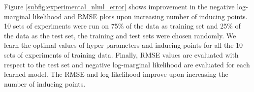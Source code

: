 Figure \ref{subfig:experimental_nlml_error} shows improvement in the negative log-marginal likelihood and RMSE plots upon increasing number of inducing points. 10 sets of experiments were run on 75\% of the data as training set and 25\% of the data as the test set, the training and test sets were chosen randomly. We learn the optimal values of hyper-parameters and inducing points for all the 10 sets of experiments of training data. Finally, RMSE values are evaluated with respect to the test set and negative log-marginal likelihood are evaluated for each learned model. The RMSE and log-likelihood improve upon increasing the number of inducing points. 
   



